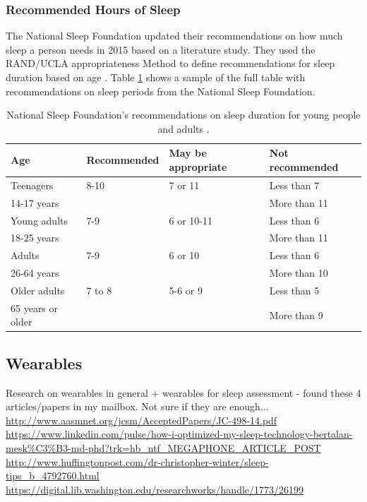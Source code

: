 \documentclass[12pt]{article} %
\begin{document}
\subsubsection{Recommended Hours of Sleep}
The National Sleep Foundation updated their recommendations on how much sleep a person needs in 2015 based on a literature study. They used the RAND/UCLA appropriateness Method to define recommendations for sleep duration based on age \cite{duration}. Table \ref{tab:recommendation} shows a sample of the full table with recommendations on sleep periods from the National Sleep Foundation. 

\begin{table}[H]
\center
\begin{footnotesize}
	\begin{tabular}{|p{2.5cm} |p{3.3cm} |p{3.5cm} |p{3.5cm} |}
	\hline
	\textbf{Age} & \textbf{Recommended} & \textbf{May be appropriate} & \textbf{Not recommended} \\
	\hline
Teenagers & 8-10 & 7 or 11 & Less than 7\\
14-17 years & & & More than 11\\
	\hline
Young adults & 7-9 & 6 or 10-11 & Less than 6\\
18-25 years & & & More than 11\\
	\hline
Adults & 7-9 & 6 or 10 & Less than 6\\
26-64 years & & & More than 10\\
	\hline
Older adults & 7 to 8 & 5-6 or 9 & Less than 5\\
65 years or older & & & More than 9\\
	\hline
	\end{tabular}
	\caption{National Sleep Foundation's recommendations on sleep duration for young people and adults \cite{duration}.}
	\label{tab:recommendation}
\end{footnotesize}
\end{table}

\subsection{Wearables}
Research on wearables in general + wearables for sleep assessment - found these 4 articles/papers in my mailbox. Not sure if they are enough...\\

\url{http://www.aasmnet.org/jcsm/AcceptedPapers/JC-498-14.pdf}\\
\url{https://www.linkedin.com/pulse/how-i-optimized-my-sleep-technology-bertalan-mesk\%C3\%B3-md-phd?trk=hb\_ntf\_MEGAPHONE\_ARTICLE\_POST}\\
\url{http://www.huffingtonpost.com/dr-christopher-winter/sleep-tips_b_4792760.html}
\url{https://digital.lib.washington.edu/researchworks/handle/1773/26199}
\end{document}
